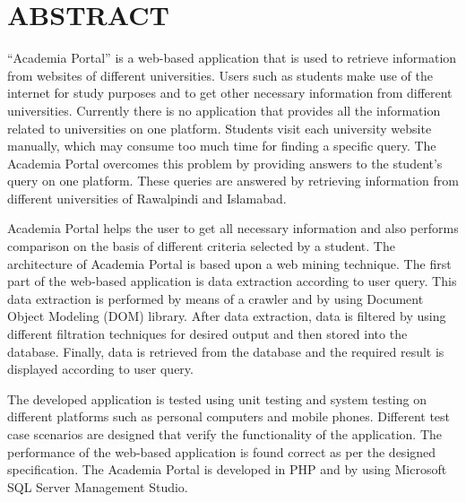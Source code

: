 \chapter*{ABSTRACT}

``Academia Portal'' is a web-based application that is used to retrieve information from websites of different universities. Users such as students make use of the internet for study purposes and to get other necessary information from different universities. Currently there is no application that provides all the information related to universities on one platform. Students visit each university website manually, which may consume too much time for finding a specific query. The Academia Portal overcomes this problem by providing answers to the student's query on one platform. These queries are answered by retrieving information from different universities of Rawalpindi and Islamabad.

Academia Portal helps the user to get all necessary information and also performs comparison on the basis of different criteria selected by a student. The architecture of Academia Portal is based upon a web mining technique. The first part of the web-based application is data extraction according to user query. This data extraction is performed by means of a crawler and by using Document Object Modeling (DOM) library. After data extraction, data is filtered by using different filtration techniques for desired output and then stored into the database. Finally, data is retrieved from the database and the required result is displayed according to user query.

The developed application is tested using unit testing and system testing on different platforms such as personal computers and mobile phones. Different test case scenarios are designed that verify the functionality of the application. The performance of the web-based application is found correct as per the designed specification. The Academia Portal is developed in PHP and by using Microsoft SQL Server Management Studio.

\clearpage
